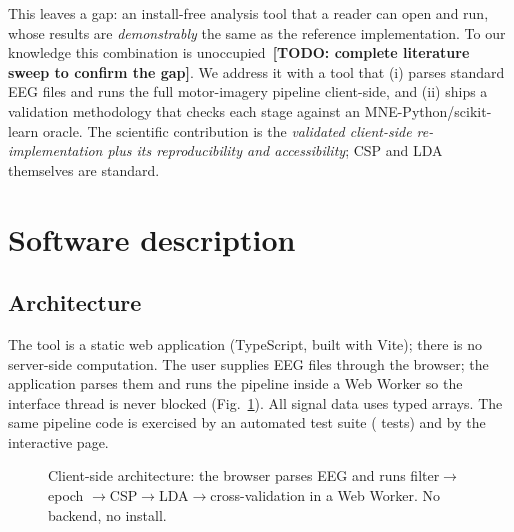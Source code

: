\documentclass[5p]{elsarticle}
\newcommand{\todo}[1]{\textbf{[TODO: #1]}}
\begin{document}
This leaves a gap: an install-free analysis tool that a reader can open and run, whose results are
\emph{demonstrably} the same as the reference implementation. To our knowledge this combination is
unoccupied~\todo{complete literature sweep to confirm the gap}. We address it with a tool that (i)
parses standard EEG files and runs the full motor-imagery pipeline client-side, and (ii) ships a
validation methodology that checks each stage against an MNE-Python/scikit-learn oracle. The
scientific contribution is the \emph{validated client-side re-implementation plus its
reproducibility and accessibility}; CSP and LDA themselves are standard.

\section{Software description}

\subsection{Architecture}
The tool is a static web application (TypeScript, built with Vite); there is no server-side
computation. The user supplies EEG files through the browser; the application parses them and runs
the pipeline inside a Web Worker so the interface thread is never blocked
(Fig.~\ref{fig:arch}). All signal data uses typed arrays. The same pipeline code is exercised by an
automated test suite (\Ntests{} tests) and by the interactive page.

\begin{figure}[!t]
\centering
\resizebox{\linewidth}{!}{}
\caption{Client-side architecture: the browser parses EEG and runs filter$\rightarrow$epoch%
$\rightarrow$CSP$\rightarrow$LDA$\rightarrow$cross-validation in a Web Worker. No backend, no install.}
\label{fig:arch}
\end{figure}
\end{document}
